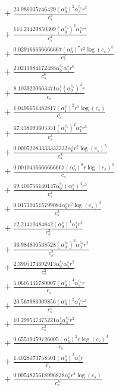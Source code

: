 \documentclass[10pt]{article}
\begin{document}
\begin{align*}
&{}  + \frac{23.986035746429 \left(\alpha_{0}^s\right)^{2} \alpha_{3}^{c_s} r^{3}}{c_{s}^{3}} \\
&{}  + \frac{114.21420850309 \left(\alpha_{0}^{c_s}\right)^{3} \alpha_{1}^s r^{4}}{c_{s}^{4}} \\
&{}  + \frac{0.029166666666667 \left(\alpha_{0}^s\right)^{7} r^{2} \log{\left(c_{s} \right)}^{5}}{c_{s}^{2}} \\
&{}  + \frac{2.0211984172488 \alpha_{0}^{c_s} \alpha_{1}^s r^{6}}{c_{s}^{6}} \\
&{}  + \frac{8.1039200663471 \alpha_{1}^s \left(\alpha_{2}^{c_s}\right)^{2} r}{c_{s}} \\
&{}  + \frac{1.0496651482817 \left(\alpha_{1}^s\right)^{2} r^{5} \log{\left(c_{s} \right)}}{c_{s}^{5}} \\
&{}  + \frac{67.438093605351 \left(\alpha_{1}^{c_s}\right)^{2} \alpha_{1}^s r^{3}}{c_{s}^{3}} \\
&{}  + \frac{0.00052083333333333 \alpha_{6}^s r^{2} \log{\left(c_{s} \right)}^{5}}{c_{s}^{2}} \\
&{}  + \frac{0.0010416666666667 \left(\alpha_{0}^s\right)^{8} r \log{\left(c_{s} \right)}^{5}}{c_{s}} \\
&{}  + \frac{69.400756140147 \alpha_{0}^{c_s} \left(\alpha_{1}^s\right)^{3} r^{2}}{c_{s}^{2}} \\
&{}  + \frac{0.017304515799084 \alpha_{6}^s r^{2} \log{\left(c_{s} \right)}^{3}}{c_{s}^{2}} \\
&{}  + \frac{72.21470484842 \left(\alpha_{0}^s\right)^{4} \alpha_{1}^s r^{3}}{c_{s}^{3}} \\
&{}  + \frac{36.984800538528 \left(\alpha_{0}^{c_s}\right)^{3} \alpha_{3}^{c_s} r^{2}}{c_{s}^{2}} \\
&{}  + \frac{2.3905174692913 \alpha_{0}^{c_s} \alpha_{5}^s r^{2}}{c_{s}^{2}} \\
&{}  + \frac{5.0605441780007 \left(\alpha_{0}^s\right)^{4} \alpha_{3}^{c_s} r}{c_{s}} \\
&{}  + \frac{20.567986009856 \left(\alpha_{0}^s\right)^{2} \alpha_{1}^{c_s} r^{5}}{c_{s}^{5}} \\
&{}  + \frac{10.299547475221 \alpha_{2}^s \alpha_{3}^{c_s} r^{2}}{c_{s}^{2}} \\
&{}  + \frac{0.65519459726005 \left(\alpha_{3}^s\right)^{2} r \log{\left(c_{s} \right)}^{3}}{c_{s}} \\
&{}  + \frac{1.4028073758501 \left(\alpha_{0}^s\right)^{2} \alpha_{5}^s r}{c_{s}} \\
&{}  + \frac{0.0054825618996838 \alpha_{0}^s r^{8} \log{\left(c_{s} \right)}}{c_{s}^{8}} \\

\end{align*}
\end{document}
